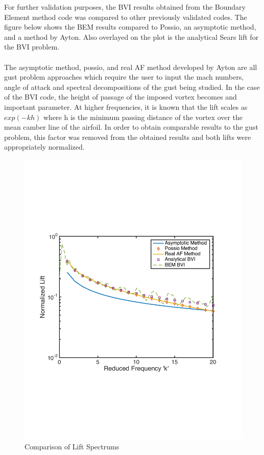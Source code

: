 \documentclass{article}
\begin{document}
\noindent For further validation purposes, the BVI results obtained from the Boundary Element method code was compared to other previously validated codes. The figure below shows the BEM results compared to Possio, an asymptotic method, and a method by Ayton. Also overlayed on the plot is the analytical Sears lift for the BVI problem. \\ \\
The asymptotic method, possio, and real AF method developed by Ayton are all gust problem approaches which require the user to input the mach numbers, angle of attack and spectral decompositions of the gust being studied. In the case of the BVI code, the height of passage of the imposed vortex becomes and important parameter. At higher frequencies, it is known that the lift scales as $exp(-kh)$ where h is the minimum passing distance of the vortex over the mean camber line of the airfoil. In order to obtain comparable results to the gust problem, this factor was removed from the obtained results and both lifts were appropriately normalized.

\begin{figure}[h]
\includegraphics[width = 4 in, height = 3 in]{fp_total_compare}
\centering
\caption{Comparison of Lift Spectrums}
\end{figure}
\end{document}
